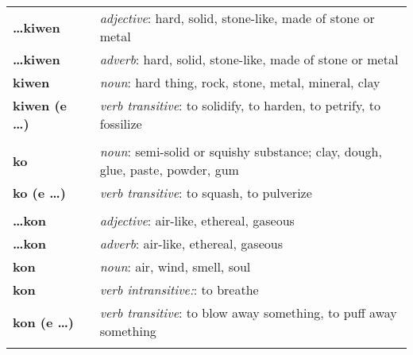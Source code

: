 \begin{supertabular}{p{2,5cm}|ll}
    \textbf{\dots kiwen}         &  & \textit{adjective}: hard, solid, stone-like, made of stone or metal                                        \\
    \textbf{\dots kiwen}         &  & \textit{adverb}: hard, solid, stone-like, made of stone or metal                                           \\
    \textbf{kiwen}               &  & \textit{noun}: hard thing, rock, stone, metal, mineral, clay                                               \\
    \textbf{kiwen (e \dots)}     &  & \textit{verb transitive}: to solidify, to harden, to petrify, to fossilize                                 \\
                                 &  &                                                                                                            \\
    \textbf{ko}                  &  & \textit{noun}: semi-solid or squishy substance; clay, dough, glue, paste, powder, gum                      \\
    \textbf{ko (e \dots)}        &  & \textit{verb transitive}: to squash, to pulverize                                                          \\
                                 &  &                                                                                                            \\
    \textbf{\dots kon}           &  & \textit{adjective}: air-like, ethereal, gaseous                                                            \\
    \textbf{\dots kon}           &  & \textit{adverb}: air-like, ethereal, gaseous                                                               \\
    \textbf{kon}                 &  & \textit{noun}: air, wind, smell, soul                                                                      \\
    \textbf{kon}                 &  & \textit{verb intransitive:}: to breathe                                                                    \\
    \textbf{kon (e \dots)}       &  & \textit{verb transitive}: to blow away something, to puff away something                                   \\
                                 &  &                                                                                                            \\

\end{supertabular}

